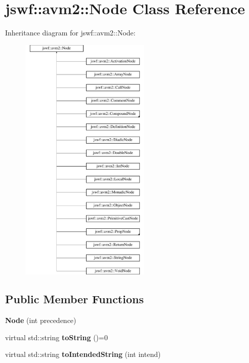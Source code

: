 \hypertarget{classjswf_1_1avm2_1_1_node}{\section{jswf\+:\+:avm2\+:\+:Node Class Reference}
\label{classjswf_1_1avm2_1_1_node}
}
Inheritance diagram for jswf\+:\+:avm2\+:\+:Node\+:\begin{figure}[H]
\begin{center}
\leavevmode
\includegraphics[height=12.000000cm]{classjswf_1_1avm2_1_1_node}
\end{center}
\end{figure}
\subsection*{Public Member Functions}
\begin{DoxyCompactItemize}
\item 
\hypertarget{classjswf_1_1avm2_1_1_node_aba5ecb59df777712fb938c3201b98c40}{{\bfseries Node} (int precedence)}\label{classjswf_1_1avm2_1_1_node_aba5ecb59df777712fb938c3201b98c40}

\item 
\hypertarget{classjswf_1_1avm2_1_1_node_a81bc5814ffea1a1b74b0d7ea2223f552}{virtual std\+::string {\bfseries to\+String} ()=0}\label{classjswf_1_1avm2_1_1_node_a81bc5814ffea1a1b74b0d7ea2223f552}

\item 
\hypertarget{classjswf_1_1avm2_1_1_node_a82fdcea3d5f55417db124759e65b1fec}{virtual std\+::string {\bfseries to\+Intended\+String} (int intend)}\label{classjswf_1_1avm2_1_1_node_a82fdcea3d5f55417db124759e65b1fec}

\end{DoxyCompactItemize}
